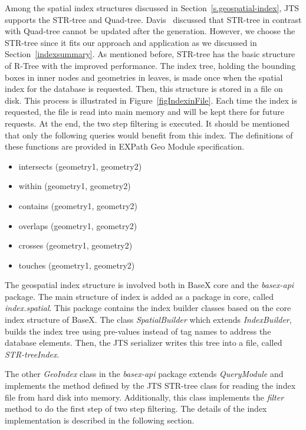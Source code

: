 \documentclass[a4paper,12pt]{article}
\begin{document}
Among the spatial index structures discussed in Section~\ref{s.geospatial-index}, JTS supports the STR-tree and Quad-tree. Davis~\cite{jts-presentation} discussed that STR-tree in contrast with Quad-tree cannot be updated after the generation. However, we choose the STR-tree since it fits our approach and application as we discussed in Section~\ref{indexsummary}. As mentioned before, STR-tree has the basic structure of R-Tree with the improved performance. The index tree, holding the bounding boxes in inner nodes and geometries in leaves, is made once when the spatial index for the database is requested. Then, this structure is stored in a file on disk. This process is illustrated in Figure~\ref{figIndexinFile}. Each time the index is requested, the file is read 
into main memory and will be kept there for future requests.
At the end, the two step filtering is executed. 
It should be mentioned that only the following queries would benefit from this index. The definitions of these functions are provided in EXPath Geo Module specification.
\begin{itemize}
\item intersects (geometry1, geometry2)
\item within (geometry1, geometry2)
\item contains (geometry1, geometry2)
\item overlaps (geometry1, geometry2)
\item crosses (geometry1, geometry2)
\item touches (geometry1, geometry2)
\end{itemize}

The geospatial index structure is involved both in BaseX core and the \textit{basex-api} package. The main structure of index is added as a package in core, called \textit{index.spatial}. This package contains the index builder classes based on the core index structure of BaseX. The class \textit{SpatialBuilder} which extends \textit{IndexBuilder}, builds the index tree using pre-values instead of tag names to address the database elements. Then, the JTS serializer writes this tree into a file, called \textit{STR-treeIndex}.

The other \textit{GeoIndex} class in the \textit{basex-api} package extends \textit{QueryModule} and implements the method defined by the JTS STR-tree class for reading the index file from hard disk into memory. Additionally, this class implements the \textit{filter} method to do the first step of two step filtering. The details of the index implementation is described in the following section.
 
\end{document}
